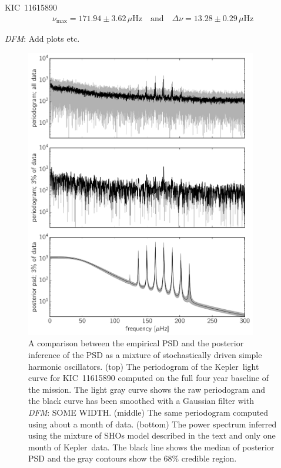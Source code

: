 \documentclass[manuscript, letterpaper]{aastex6}
\newcommand{\project}[1]{\textsf{#1}}
\newcommand{\kepler}{\project{Kepler}}
\newcommand{\figurelabel}[1]{\label{fig:#1}}
\newcommand{\todo}[3]{{\color{#2}\emph{#1}: #3}}
\newcommand{\dfmtodo}[1]{\todo{DFM}{red}{#1}}
\begin{document}
KIC~11615890 \citep{Pinsonneault:2014}
\begin{eqnarray}
    \nu_\mathrm{max} = 171.94 \pm 3.62 \,\mu\mathrm{Hz} \quad\mathrm{and}\quad
    \Delta\nu = 13.28 \pm 0.29 \,\mu\mathrm{Hz}
\end{eqnarray}

\dfmtodo{Add plots etc.}

\begin{figure}[!htbp]
\begin{center}
\includegraphics[width=0.9\textwidth]{figures/astero-11615890-comparisons.pdf}
\caption{A comparison between the empirical PSD and the posterior inference of
the PSD as a mixture of stochastically driven simple harmonic oscillators.
(top) The periodogram of the \kepler\ light curve for KIC~11615890 computed
    on the full four year baseline of the mission.
    The light gray curve shows the raw periodogram and the black curve has
    been smoothed with a Gaussian filter with \dfmtodo{SOME WIDTH}.
(middle) The same periodogram computed using about a month of data.
(bottom) The power spectrum inferred using the mixture of SHOs model described
    in the text and only one month of \kepler\ data.
    The black line shows the median of posterior PSD and the gray contours
    show the 68\% credible region.
    \figurelabel{astero}}
\end{center}
\end{figure}
\end{document}
